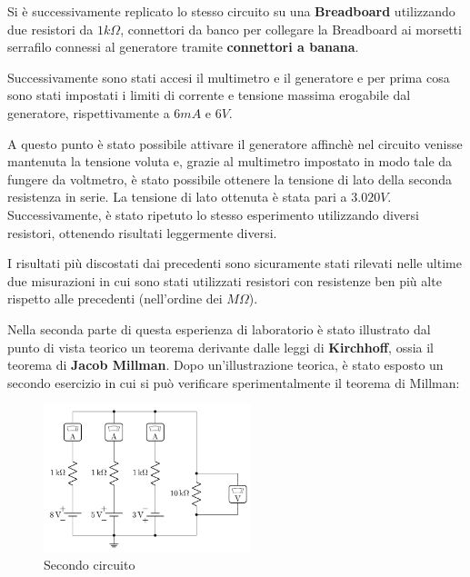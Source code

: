     Si è successivamente replicato lo stesso circuito su una \textbf{Breadboard} utilizzando due resistori da
    $1k\Omega$, connettori da banco per collegare la Breadboard ai morsetti serrafilo connessi al generatore
    tramite \textbf{connettori a banana}. \par
    Successivamente sono stati accesi il multimetro e il generatore e per prima cosa sono stati impostati i limiti di corrente e tensione massima
    erogabile dal generatore, rispettivamente a $6mA$ e $6V$.\par
    A questo punto è stato possibile attivare il generatore affinchè nel circuito venisse mantenuta la tensione voluta e,
    grazie al multimetro impostato in modo tale da fungere da voltmetro, è stato possibile ottenere la tensione di lato della
    seconda resistenza in serie. La tensione di lato ottenuta è stata pari a $3.020V$.
    Successivamente, è stato ripetuto lo stesso esperimento utilizzando diversi resistori, ottenendo risultati leggermente diversi.\par
    I risultati più discostati dai precedenti sono sicuramente stati rilevati nelle ultime due misurazioni in cui sono stati utilizzati
    resistori con resistenze ben più alte rispetto alle precedenti (nell'ordine dei $M\Omega$).\par
    \par
    \newpage
    Nella seconda parte di questa esperienza di laboratorio è stato illustrato dal punto di vista teorico
    un teorema derivante dalle leggi di \textbf{Kirchhoff}, ossia il teorema di \textbf{Jacob Millman}.
    Dopo un'illustrazione teorica, è stato esposto un secondo esercizio in cui si può verificare sperimentalmente il teorema di Millman:
    
    \begin{figure}[!h]
        \begin{center}
            \includegraphics[width = 6cm]{ese2.png}
            \caption{Secondo circuito}
            \label{ese2}
        \end{center}
    \end{figure}

